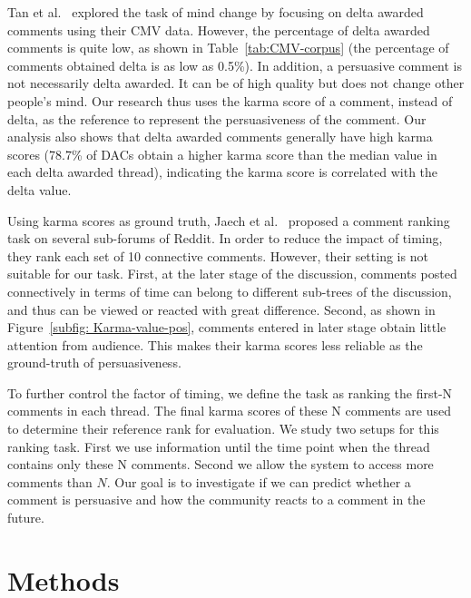 \documentclass[11pt]{article}
\begin{document}
Tan et al.~ explored the task of mind change by focusing on delta awarded comments using their CMV data. However, the percentage of delta awarded comments is quite low, as shown in Table~\ref{tab:CMV-corpus} (the percentage of comments obtained delta is as low as 0.5\%). In addition, a persuasive comment is not necessarily delta awarded. It can be of high quality but does not change other people's mind. Our research thus uses the karma score of a comment, instead of delta, as the reference to represent the persuasiveness of the comment. Our analysis also shows that delta awarded comments generally have high karma scores (78.7\% of DACs obtain a higher karma score than the median value in each delta awarded thread), indicating the karma score is correlated with the delta value. 

Using karma scores as ground truth, Jaech et al.~ proposed a comment ranking task on several sub-forums of Reddit. In order to reduce the impact of timing, they rank each set of 10 connective comments. However, their setting is not suitable for our task. First, at the later stage of the discussion, comments posted connectively in terms of time can belong to different sub-trees of the discussion, and thus can be viewed or reacted with great difference. Second, as shown in Figure~\ref{subfig: Karma-value-pos}, comments entered in later stage obtain little attention from audience. This makes their karma scores less reliable as the ground-truth of persuasiveness. 

To further control the factor of timing, we define the task as ranking the first-N comments in each thread. The final karma scores of these N comments are used to determine their reference rank for evaluation. We study two setups for this ranking task. First we use information until the time point when the thread contains only these N comments.  Second we allow the system to access more comments than $N$. Our goal is to investigate if we can predict whether a comment is persuasive and how the community reacts to a comment in the future.

\section{Methods}
\end{document}
